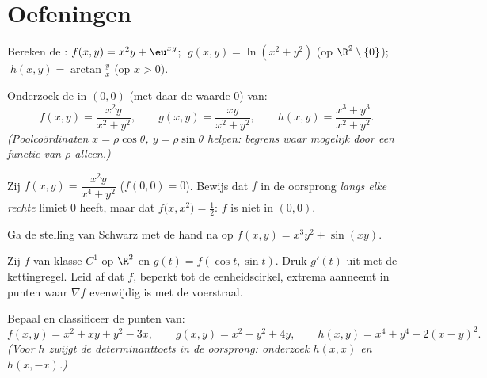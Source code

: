 \section{Oefeningen}

\begin{exercise}[$\star$]\label{exo:b1:multivar:1}
Bereken de : $f(x,y) = x^2 y + \eu^{xy}$;
$\;g(x,y) = \ln(x^2 + y^2)$ (op $\R^2\setminus\{0\}$); $\;h(x,y) =
\arctan\frac yx$ (op $x > 0$).
\end{exercise}

\begin{exercise}[$\star$]\label{exo:b1:multivar:2}
Onderzoek de  in $(0,0)$ (met daar de waarde $0$) van:
\[
f(x,y) = \frac{x^2 y}{x^2 + y^2},
\qquad
g(x,y) = \frac{xy}{x^2 + y^2},
\qquad
h(x,y) = \frac{x^3 + y^3}{x^2 + y^2}.
\]
\emph{(Poolcoördinaten $x = \rho\cos\theta$, $y = \rho\sin\theta$
helpen: begrens waar mogelijk door een functie van $\rho$ alleen.)}
\end{exercise}

\begin{exercise}[$\star\star$]\label{exo:b1:multivar:3}
Zij $f(x,y) = \dfrac{x^2 y}{x^4 + y^2}$ ($f(0,0) = 0$). Bewijs dat
$f$ in de oorsprong \emph{langs elke rechte} limiet $0$ heeft, maar
dat $f\bigl(x, x^2\bigr) = \frac12$: $f$ is niet  in
$(0,0)$.
\end{exercise}

\begin{exercise}[$\star$]\label{exo:b1:multivar:4}
Ga de stelling van Schwarz met de hand na op $f(x, y) = x^3 y^2 +
\sin(xy)$.
\end{exercise}

\begin{exercise}[$\star\star$]\label{exo:b1:multivar:5}
Zij $f$ van klasse $C^1$ op $\R^2$ en $g(t) = f(\cos t, \sin t)$.
Druk $g'(t)$ uit met de kettingregel. Leid af dat $f$, beperkt tot
de eenheidscirkel, extrema aanneemt in punten waar $\nabla f$
evenwijdig is met de voerstraal.
\end{exercise}

\begin{exercise}[$\star\star$]\label{exo:b1:multivar:6}
Bepaal en classificeer de  punten van:
\[
f(x, y) = x^2 + xy + y^2 - 3x,
\qquad
g(x, y) = x^2 - y^2 + 4y,
\qquad
h(x, y) = x^4 + y^4 - 2(x - y)^2 .
\]
\emph{(Voor $h$ zwijgt de determinanttoets in de oorsprong:
onderzoek $h(x, x)$ en $h(x, -x)$.)}
\end{exercise}

